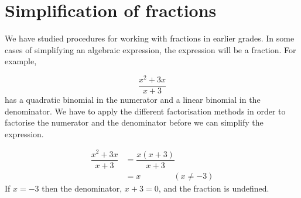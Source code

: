 \section{Simplification of fractions}
We have studied procedures for working with fractions in earlier grades.
In some cases of simplifying an algebraic expression, the expression will be a fraction. For example, 

\begin{equation*}
  \dfrac{{x}^{2}+3x}{x+3}
\end{equation*}
has a quadratic binomial in the numerator and a linear binomial in the denominator. We have to apply the different factorisation methods in order to factorise the numerator and the denominator before we can simplify the expression.\par 

\begin{align*}
  \dfrac{{x}^{2}+3x}{x+3} &= \dfrac{x(x+3)}{x+3} \\
                          &= x \qquad\qquad (x\neq -3)
\end{align*}
If $x = -3$ then the denominator, $x+3 = 0$, and the fraction is undefined. 

